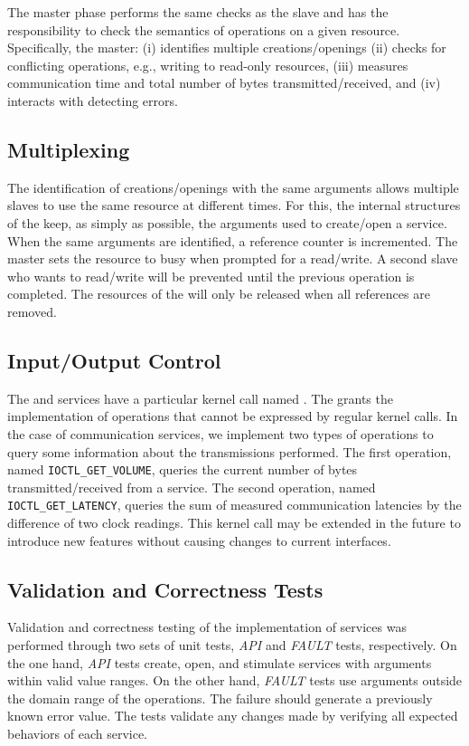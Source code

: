 			The master phase performs the same checks as the slave and has the
			responsibility to check the semantics of operations on a given resource.
			Specifically, the master:
			(i) identifies multiple creations/openings
			(ii) checks for conflicting operations, e.g., writing to read-only resources,
			(iii) measures communication time and total number of bytes transmitted/received, and
			(iv) interacts with \nanvixhal detecting errors.

		\subsection{Multiplexing}

			The identification of creations/openings with the same arguments
			allows multiple slaves to use the same resource at different times.
			For this, the internal structures of the \os keep, as simply as possible,
			the arguments used to create/open a service. When the same arguments are
			identified, a reference counter is incremented. The master sets the resource
			to busy when prompted for a read/write. A second slave who wants to read/write
			 will be prevented until the previous operation is completed. The resources
			 of the \hal will only be released when all references are removed.

		\subsection{Input/Output Control}

			The \mailbox and \portal services have a particular kernel
			call named
			\ioctl. The \ioctl grants the implementation of operations that cannot be
			expressed by regular kernel calls. In the case of communication services,
			we implement two types of operations to query some
			information about the
			transmissions performed. The first operation, named \texttt{IOCTL\_GET\_VOLUME},
			queries the current number of bytes transmitted/received from a service.
			The second operation, named \texttt{IOCTL\_GET\_LATENCY}, queries the sum
			of measured communication latencies by the difference of two clock readings.
			This kernel call may be extended in the future to introduce new features
			without causing changes to current interfaces.

		\subsection{Validation and Correctness Tests}

			Validation and correctness testing of the implementation of services was
			performed through two sets of unit tests, \textit{API} and \textit{FAULT}
			tests, respectively. On the one hand, \textit{API} tests create, open, and
			stimulate services with arguments within valid value ranges. On the other
			hand, \textit{FAULT} tests use arguments outside the domain range of the
			operations. The failure should generate a previously known error value.
			The tests validate any changes made by verifying all expected behaviors
			of each service.
